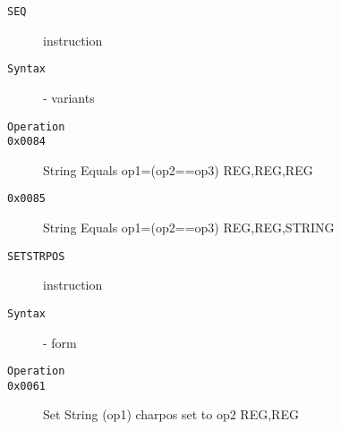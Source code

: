 \clearpage
\begin{description}
\item[\texttt{SEQ}] instruction\\
\item[\texttt{Syntax}] - variants\\

\item[\texttt{Operation}]
\item[\texttt{}]
\item[\texttt{0x0084}] String Equals op1=(op2==op3)  {REG,REG,REG}       \\
\item[\texttt{0x0085}] String Equals op1=(op2==op3)  {REG,REG,STRING}    \\
\end{description}
\clearpage
\begin{description}
\item[\texttt{SETSTRPOS}] instruction\\
\item[\texttt{Syntax}] - form \\

\item[\texttt{Operation}]
\item[\texttt{}]
\item[\texttt{0x0061}] Set String (op1) charpos set to op2  {REG,REG}           \\
\end{description}
\clearpage
